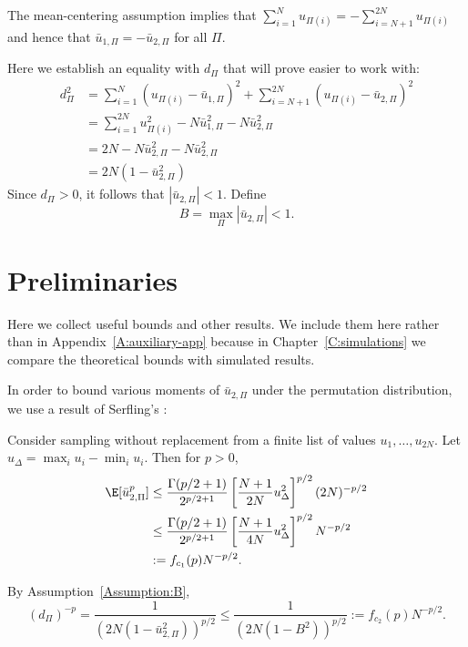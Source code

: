 The mean-centering assumption implies that
$\sum_{i=1}^{N} u_{\Pi(i)} = - \sum_{i=N+1}^{2N} u_{\Pi(i)}$
and hence that $\bar{u}_{1,\Pi} = -\bar{u}_{2,\Pi}$ for all $\Pi$.

Here we establish an equality with $d_{\Pi}$ that will prove easier to work with:
\begin{align*}
  d_\Pi^2 &=  \sum_{i=1}^N(u_{\Pi(i)} - \bar{u}_{1,\Pi})^2 +
  \sum_{i=N+1}^{2N}(u_{\Pi(i)} - \bar{u}_{2,\Pi})^2 \\
  &= \sum_{i=1}^{2N} u_{\Pi(i)}^2 - N \bar{u}_{1,\Pi}^2 - N \bar{u}_{2,\Pi}^2 \\
  &= 2N - N \bar{u}_{2,\Pi}^2 - N \bar{u}_{2,\Pi}^2 \\
  &= 2N(1 - \bar{u}_{2,\Pi}^2)
\end{align*}
Since $d_\Pi > 0$, it follows that $|\bar{u}_{2,\Pi}| < 1$.  Define
\begin{equation}
  \label{Assumption:B}
  B = \max_\Pi |\bar{u}_{2,\Pi}| < 1.
\end{equation}

\section{Preliminaries}
\label{S:stein-proof-preliminaries}
Here we collect useful bounds and other results.  We include them here rather than
in Appendix~\ref{A:auxiliary-app} because in Chapter~\ref{C:simulations} we compare
the theoretical bounds with simulated results.

In order to bound various moments of $\bar{u}_{2,\Pi}$ under the
permutation distribution, we use a result of Serfling's
\cite{serfling1974probability}:
\begin{proposition}
  Consider sampling without replacement from a finite list of values
  $u_1, \ldots, u_{2N}$.  Let $u_{\Delta} = \max_i u_{i} - \min_i
  u_{i}$.
  Then for $p > 0$,
  \begin{align}
    \E [\bar{u}_{2,\Pi}^p]
    &\leq \frac{\Gamma(p/2 + 1)}{2^{p/2 + 1}}
    \left [ \frac{N+1}{2N}u_{\Delta}^2 \right ]^{p/2}
    (2N)^{-p/2} \nonumber \\
    &\leq \frac{\Gamma(p/2 + 1)}{2^{p/2 + 1}}
    \left [ \frac{N+1}{4N}u_{\Delta}^2 \right ]^{p/2}
    N^{-p/2} \nonumber \\
    &:= f_{c_1}(p)N^{-p/2} \label{def:serfling}.
  \end{align}
\end{proposition}

By Assumption~\eqref{Assumption:B},
\begin{equation}
\label{def:dp}
  (d_{\Pi})^{-p} = \frac{1}{(2N(1-\bar{u}_{2,\Pi}^2))^{p/2}} \leq \frac{1}{(2N(1-B^2))^{p/2}} :=
  f_{c_2}(p) N^{-p/2}.
\end{equation}

